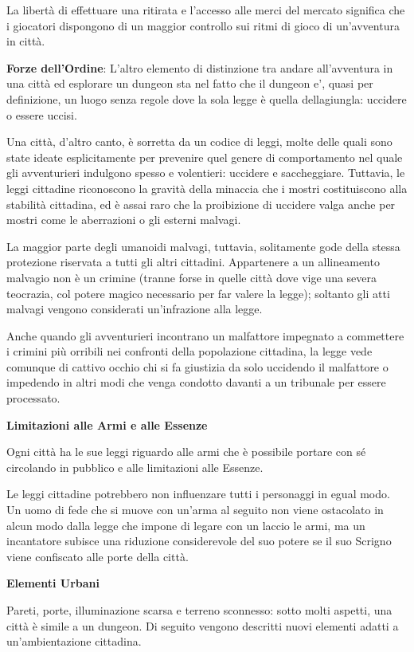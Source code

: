 \documentclass[a4paper,11pt,twoside,openany]{book}
\begin{document}
La libertà di effettuare una ritirata e l'accesso alle merci del mercato significa che i giocatori dispongono di un maggior controllo sui ritmi di gioco di un'avventura in città.

\textbf{Forze dell'Ordine}: L'altro elemento di distinzione tra andare all'avventura in una città ed esplorare un dungeon sta nel fatto che il dungeon e', quasi per definizione, un luogo senza regole dove la sola legge è quella dellagiungla: uccidere o essere uccisi.

Una città, d'altro canto, è sorretta da un codice di leggi, molte delle quali sono state ideate esplicitamente per prevenire quel genere di comportamento nel quale gli avventurieri indulgono spesso e volentieri: uccidere e saccheggiare. Tuttavia, le leggi cittadine riconoscono la gravità della minaccia che i mostri costituiscono alla stabilità cittadina, ed è assai raro che la proibizione di uccidere valga anche per mostri come le aberrazioni o gli esterni malvagi.

La maggior parte degli umanoidi malvagi, tuttavia, solitamente gode della stessa protezione riservata a tutti gli altri cittadini. Appartenere a un allineamento malvagio non è un crimine (tranne forse in quelle città dove vige una severa teocrazia, col potere magico necessario per far valere la legge); soltanto gli atti malvagi vengono considerati un'infrazione alla legge.

Anche quando gli avventurieri incontrano un malfattore impegnato a commettere i crimini più orribili nei confronti della popolazione cittadina, la legge vede comunque di cattivo occhio chi si fa giustizia da solo uccidendo il malfattore o impedendo in altri modi che venga condotto davanti a un tribunale per essere processato.

\textbf{Limitazioni alle Armi e alle Essenze}

Ogni città ha le sue leggi riguardo alle armi che è possibile portare con sé circolando in pubblico e alle limitazioni alle Essenze.

Le leggi cittadine potrebbero non influenzare tutti i personaggi in egual modo. Un uomo di fede che si muove con un'arma al seguito non viene ostacolato in alcun modo dalla legge che impone di legare con un laccio le armi, ma un incantatore subisce una riduzione considerevole del suo potere se il suo Scrigno viene confiscato alle porte della città.

\textbf{Elementi Urbani}

Pareti, porte, illuminazione scarsa e terreno sconnesso: sotto molti aspetti, una città è simile a un dungeon. Di seguito vengono descritti nuovi elementi adatti a un'ambientazione cittadina.
\end{document}
